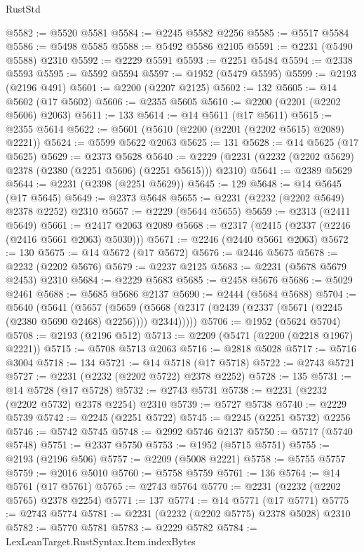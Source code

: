 \begin{lexlean}{RustStd}
\begin{coremodule}
@5582 := @5520 @5581
@5584 := @2245 @5582 @2256
@5585 := @5517 @5584
@5586 := @5498 @5585
@5588 := @5492 @5586 @2105
@5591 := @2231 (@5490 @5588) @2310
@5592 := @2229 @5591
@5593 := @2251 @5484
@5594 := @2338 @5593
@5595 := @5592 @5594
@5597 := @1952 (@5479 @5595)
@5599 := @2193 (@2196 @491)
@5601 := @2200 (@2207 @2125)
@5602 := 132
@5605 := @14 @5602 (@17 @5602)
@5606 := @2355 @5605
@5610 := @2200 (@2201 (@2202 @5606) @2063)
@5611 := 133
@5614 := @14 @5611 (@17 @5611)
@5615 := @2355 @5614
@5622 := @5601 (@5610 (@2200 (@2201 (@2202 @5615) @2089) @2221))
@5624 := @5599 @5622 @2063
@5625 := 131
@5628 := @14 @5625 (@17 @5625)
@5629 := @2373 @5628
@5640 := @2229 (@2231 (@2232 (@2202 @5629) @2378 (@2380 (@2251 @5606) (@2251 @5615))) @2310)
@5641 := @2389 @5629
@5644 := @2231 (@2398 (@2251 @5629))
@5645 := 129
@5648 := @14 @5645 (@17 @5645)
@5649 := @2373 @5648
@5655 := @2231 (@2232 (@2202 @5649) @2378 @2252) @2310
@5657 := @2229 (@5644 @5655)
@5659 := @2313 (@2411 @5649)
@5661 := @2417 @2063 @2089
@5668 := @2317 (@2415 (@2337 (@2246 (@2416 @5661 @2063) @5030)))
@5671 := @2246 (@2440 @5661 @2063)
@5672 := 130
@5675 := @14 @5672 (@17 @5672)
@5676 := @2446 @5675
@5678 := @2232 (@2202 @5676)
@5679 := @2237 @2125
@5683 := @2231 (@5678 @5679 @2453) @2310
@5684 := @2229 @5683
@5685 := @2458 @5676
@5686 := @5029 @2461
@5688 := @5685 @5686 @2137
@5690 := @2444 (@5684 @5688)
@5704 := @5640
    (@5641
      (@5657
        (@5659 (@5668 (@2317 (@2439 (@2337 (@5671 (@2245 (@2380 @5690 @2468) @2256)))) @2344)))))
@5706 := @1952 (@5624 @5704)
@5708 := @2193 (@2196 @512)
@5713 := @2209 (@5471 (@2200 (@2218 @1967) @2221))
@5715 := @5708 @5713 @2063
@5716 := @2818 @5028
@5717 := @5716 @3004
@5718 := 134
@5721 := @14 @5718 (@17 @5718)
@5722 := @2743 @5721
@5727 := @2231 (@2232 (@2202 @5722) @2378 @2252)
@5728 := 135
@5731 := @14 @5728 (@17 @5728)
@5732 := @2743 @5731
@5738 := @2231 (@2232 (@2202 @5732) @2378 @2254) @2310
@5739 := @5727 @5738
@5740 := @2229 @5739
@5742 := @2245 (@2251 @5722)
@5745 := @2245 (@2251 @5732) @2256
@5746 := @5742 @5745
@5748 := @2992 @5746 @2137
@5750 := @5717 (@5740 @5748)
@5751 := @2337 @5750
@5753 := @1952 (@5715 @5751)
@5755 := @2193 (@2196 @506)
@5757 := @2209 (@5008 @2221)
@5758 := @5755 @5757
@5759 := @2016 @5010
@5760 := @5758 @5759
@5761 := 136
@5764 := @14 @5761 (@17 @5761)
@5765 := @2743 @5764
@5770 := @2231 (@2232 (@2202 @5765) @2378 @2254)
@5771 := 137
@5774 := @14 @5771 (@17 @5771)
@5775 := @2743 @5774
@5781 := @2231 (@2232 (@2202 @5775) @2378 @5028) @2310
@5782 := @5770 @5781
@5783 := @2229 @5782
@5784 := LexLeanTarget.RustSyntax.Item.indexBytes

\end{coremodule}
\end{lexlean}

